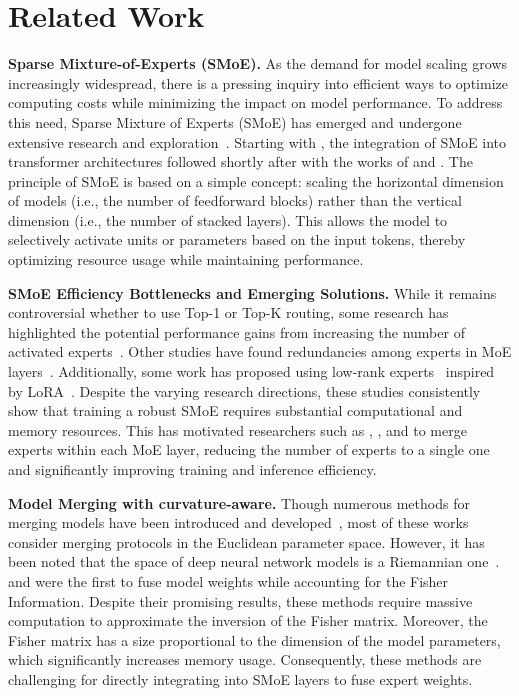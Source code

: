 \section{Related Work}
\textbf{Sparse Mixture-of-Experts (SMoE).} As the demand for model scaling grows increasingly widespread, there is a pressing inquiry into efficient ways to optimize computing costs while minimizing the impact on model performance. To address this need, Sparse Mixture of Experts (SMoE) has emerged and undergone extensive research and exploration~\citep{shazeer2017outrageously,lepikhin2021gshard,fedus2022switch}. Starting with \citep{shazeer2017outrageously}, the integration of SMoE into transformer architectures followed shortly after with the works of \citep{lepikhin2021gshard} and \citep{fedus2022switch}. The principle of SMoE is based on a simple concept: scaling the horizontal dimension of models (i.e., the number of feedforward blocks) rather than the vertical dimension (i.e., the number of stacked layers). This allows the model to selectively activate units or parameters based on the input tokens, thereby optimizing resource usage while maintaining performance.

\textbf{SMoE Efficiency Bottlenecks and Emerging Solutions.} While it remains controversial whether to use Top-1 or Top-K routing, some research has highlighted the potential performance gains from increasing the number of activated experts~\citep{shazeer2017outrageously,chen2023sparse}. Other studies have found redundancies among experts in MoE layers~\citep{li2024merge, lu2024expertsequalefficientexpert}. Additionally, some work has proposed using low-rank experts~\citep{wu2024mixture,liu2024mixturelowrankexpertstransferable,Wu_2024_CVPR} inspired by LoRA~\citep{hu2022lora}. Despite the varying research directions, these studies consistently show that training a robust SMoE requires substantial computational and memory resources. This has motivated researchers such as \citep{li2024merge}, \citep{he-etal-2023-merging}, and \citep{zhong2024lory} to merge experts within each MoE layer, reducing the number of experts to a single one and significantly improving training and inference efficiency.


\textbf{Model Merging with curvature-aware.} Though numerous methods for merging models have been introduced and developed~\citep{yadav2023ties-merging,cai2023robust,ilharco2022patching,matena2022merging,jin2022dataless,don2022cold,rame2023model, Tuan2024Hypertrans,  lu2024twinmerging}, most of these works consider merging protocols in the Euclidean parameter space. However, it has been noted that the space of deep neural network models is a Riemannian one~\citep{amari1998natgrad}. \citep{matena2022merging} and \citep{jin2022dataless} were the first to fuse model weights while accounting for the Fisher Information. Despite their promising results, these methods require massive computation to approximate the inversion of the Fisher matrix. Moreover, the Fisher matrix has a size proportional to the dimension of the model parameters, which significantly increases memory usage. Consequently, these methods are challenging for directly integrating into SMoE layers to fuse expert weights.